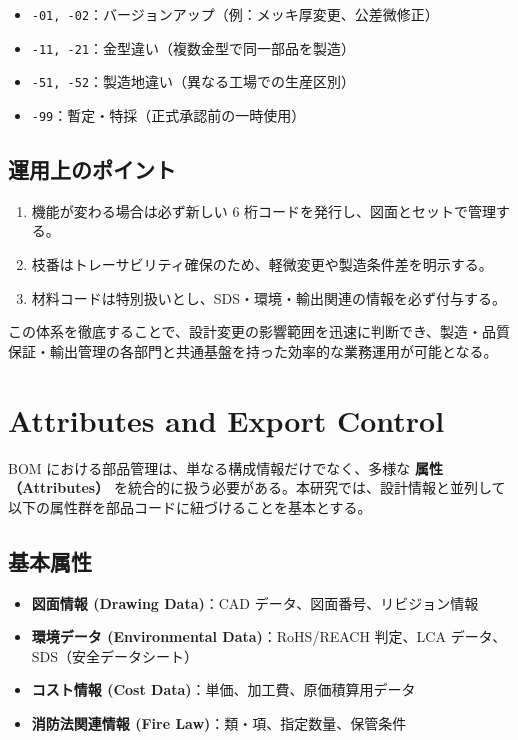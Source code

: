 \documentclass[10pt,conference]{IEEEtran}
\begin{document}
\begin{itemize}
  \item \texttt{-01, -02}：バージョンアップ（例：メッキ厚変更、公差微修正）
  \item \texttt{-11, -21}：金型違い（複数金型で同一部品を製造）
  \item \texttt{-51, -52}：製造地違い（異なる工場での生産区別）
  \item \texttt{-99}：暫定・特採（正式承認前の一時使用）
\end{itemize}

\subsection{運用上のポイント}
\begin{enumerate}
  \item 機能が変わる場合は必ず新しい 6 桁コードを発行し、図面とセットで管理する。  
  \item 枝番はトレーサビリティ確保のため、軽微変更や製造条件差を明示する。  
  \item 材料コードは特別扱いとし、SDS・環境・輸出関連の情報を必ず付与する。  
\end{enumerate}

この体系を徹底することで、設計変更の影響範囲を迅速に判断でき、製造・品質保証・輸出管理の各部門と共通基盤を持った効率的な業務運用が可能となる。

\section{Attributes and Export Control}
BOM における部品管理は、単なる構成情報だけでなく、多様な \textbf{属性（Attributes）} を統合的に扱う必要がある。本研究では、設計情報と並列して以下の属性群を部品コードに紐づけることを基本とする。

\subsection{基本属性}
\begin{itemize}
  \item \textbf{図面情報 (Drawing Data)}：CAD データ、図面番号、リビジョン情報
  \item \textbf{環境データ (Environmental Data)}：RoHS/REACH 判定、LCA データ、SDS（安全データシート）
  \item \textbf{コスト情報 (Cost Data)}：単価、加工費、原価積算用データ
  \item \textbf{消防法関連情報 (Fire Law)}：類・項、指定数量、保管条件
\end{itemize}
\end{document}

